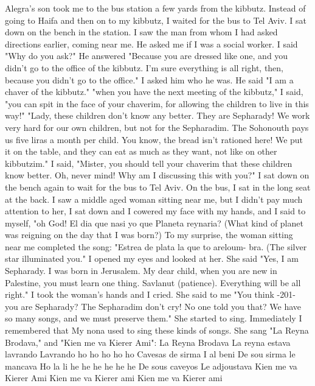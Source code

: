 
Alegra's son took me to the bus station a few yards from the 
kibbutz. Instead of going to Haifa and then on to my kibbutz, I waited 
for the bus to Tel Aviv. I sat down on the bench in the station. I 
saw the man from whom I had asked directions earlier, coming near me. 
He asked me if I was a social worker. I said "Why do you ask?" 
He answered "Because you are dressed like one, and you didn't go 
to the office of the kibbutz. I'm sure everything is all right, then, 
because you didn't go to the office." 
I asked him who he was. He said "I am a chaver of the kibbutz." 
"when you have the next meeting of the kibbutz," I said, "you can 
spit in the face of your chaverim, for allowing the children to live 
in this way!" 
"Lady, these children don't know any better. They are Sepharady!
We work very hard for our own children, but not for the Sepharadim. The
Sohonouth pays us five liras a month per child. You know, the bread 
isn't rationed here! We put it on the table, and they can eat as much 
as they want, not like on other kibbutzim." 
I said, "Mister, you should tell your chaverim that these children know better. Oh, never mind! Why am I discussing this with you?" 
I sat down on the bench again to wait for the bus to Tel Aviv. 
On the bus, I sat in the long seat at the back. I saw a middle 
aged woman sitting near me, but I didn't pay much attention to her, I 
sat down and I cowered my face with my hands, and I said to myself, "oh 
God! El dia que nasi yo que Planeta reynaria? (What kind of planet 
was reigning on the day that I was born?) To my surprise, the woman 
sitting near me completed the song: "Estrea de plata la que to areloum-
bra. (The silver star illuminated you." I opened my eyes and looked 
at her. She said "Yes, I am Sepharady. I was born in Jerusalem. My 
dear child, when you are new in Palestine, you must learn one thing. 
Savlanut (patience). Everything will be all right." 
I took the woman's hands and I cried. She said to me "You think 
-201- 
you are Sepharady? The Sepharadim don't cry! No one told you that? 
We have so many songs, and we must preserve them." She started to 
sing. Immediately I remembered that My nona used to sing these kinds 
of songs. She sang "La Reyna Brodava," and "Kien me va Kierer Ami": 
La Reyna Brodava 
La reyna estava lavrando 
Lavrando ho ho ho ho ho 
Cavesas de sirma 
I al beni 
De sou sirma le mancava 
Ho la li he he he he he he 
De sous caveyos 
Le adjoustava 
Kien me va Kierer Ami 
Kien me va Kierer ami 
Kien me va Kierer ami 
